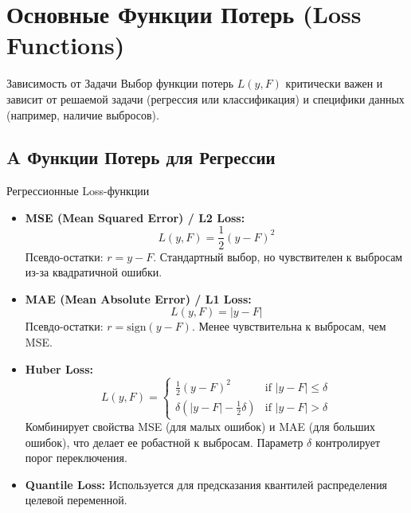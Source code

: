 \section{Основные Функции Потерь (Loss Functions)}

\begin{textbox}{Зависимость от Задачи}
    Выбор функции потерь $L(y, F)$ критически важен и зависит от решаемой задачи (регрессия или классификация) и специфики данных (например, наличие выбросов).
\end{textbox}

\subsection{A Функции Потерь для Регрессии}
\begin{myexampleblock}{Регрессионные Loss-функции}
    \begin{itemize}[nosep, leftmargin=*]
        \item \textbf{MSE (Mean Squared Error) / L2 Loss:}
            \[ L(y, F) = \frac{1}{2}(y - F)^2 \]
            Псевдо-остатки: $r = y - F$. Стандартный выбор, но чувствителен к выбросам из-за квадратичной ошибки.
        \item \textbf{MAE (Mean Absolute Error) / L1 Loss:}
            \[ L(y, F) = |y - F| \]
            Псевдо-остатки: $r = \text{sign}(y - F)$. Менее чувствительна к выбросам, чем MSE.
        \item \textbf{Huber Loss:}
            \[ L(y, F) = \begin{cases} \frac{1}{2}(y - F)^2 & \text{if } |y - F| \le \delta \\ \delta (|y - F| - \frac{1}{2}\delta) & \text{if } |y - F| > \delta \end{cases} \]
            Комбинирует свойства MSE (для малых ошибок) и MAE (для больших ошибок), что делает ее робастной к выбросам. Параметр $\delta$ контролирует порог переключения.
        \item \textbf{Quantile Loss:} Используется для предсказания квантилей распределения целевой переменной.
    \end{itemize}
\end{myexampleblock}


